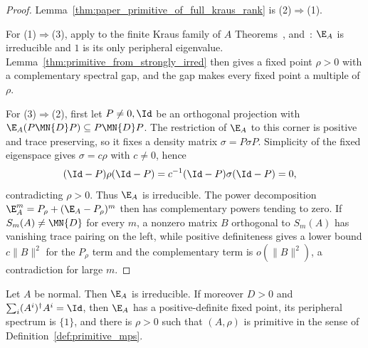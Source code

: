 \begin{proof}\leanok
    Lemma~\ref{thm:paper_primitive_of_full_kraus_rank} is
    (2)$\Rightarrow$(1).

    For (1)$\Rightarrow$(3), apply to the finite Kraus family of $A$
    Theorems~\cite[``Positive-definite fixed point from vector spreading'']{QICLean2026Blueprint},
    \cite[``Primitivity from vector spreading'']{QICLean2026Blueprint}
    and~\cite[``Irreducibility from vector spreading'']{QICLean2026Blueprint}:
    $\E_A$ is irreducible and $1$ is its only peripheral eigenvalue.
    Lemma~\ref{thm:primitive_from_strongly_irred} then gives a fixed point
    $\rho>0$ with a complementary spectral gap, and the gap makes every fixed
    point a multiple of $\rho$.

    For (3)$\Rightarrow$(2), first let $P\neq0,\Id$ be an orthogonal
    projection with $\E_A(P\MN{D}P)\subseteq P\MN{D}P$. The restriction of
    $\E_A$ to this corner is positive and trace preserving, so it fixes a
    density matrix $\sigma=P\sigma P$. Simplicity of the fixed eigenspace
    gives $\sigma=c\rho$ with $c\neq0$, hence
    \begin{align}
        (\Id-P)\rho(\Id-P) & =c^{-1}(\Id-P)\sigma(\Id-P)=0,
        \notag
    \end{align}
    contradicting $\rho>0$. Thus $\E_A$ is irreducible. The power
    decomposition $\E_A^m=P_\rho+(\E_A-P_\rho)^m$ then has complementary
    powers tending to zero.
    If $S_m(A)\neq\MN{D}$ for every $m$, a nonzero matrix $B$ orthogonal to
    $S_m(A)$ has vanishing trace pairing on the left, while positive
    definiteness gives a lower bound $c\lVert B\rVert^2$ for the $P_\rho$ term
    and the complementary term is $o(\lVert B\rVert^2)$, a contradiction for
    large $m$.
\end{proof}

\begin{lemma}
    \label{thm:normalized_normal_strongly_irreducible}
    \leanok
    Let $A$ be normal. Then $\E_A$ is irreducible. If moreover $D>0$ and
    $\sum_i(A^i)^\dagger A^i=\Id$, then $\E_A$ has a positive-definite fixed
    point, its peripheral spectrum is $\{1\}$, and there is $\rho>0$ such that
    $(A,\rho)$ is primitive in the sense of
    Definition~\ref{def:primitive_mps}.
\end{lemma}

